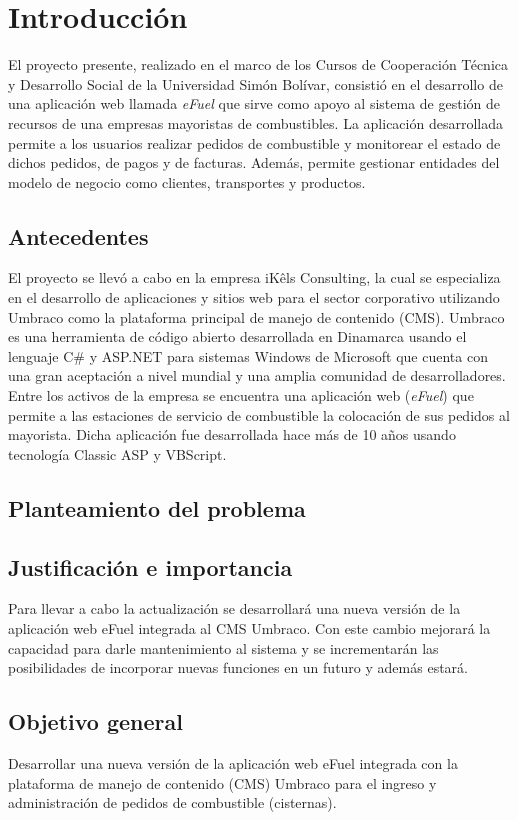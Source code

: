 \chapter*{Introducción}

El proyecto presente, realizado en el marco de los Cursos de Cooperación Técnica y Desarrollo Social de la Universidad Simón Bolívar, consistió en el desarrollo de una aplicación web llamada \emph{eFuel} que sirve como apoyo al sistema de gestión de recursos de una empresas mayoristas de combustibles. La aplicación desarrollada permite a los usuarios realizar pedidos de combustible y monitorear el estado de dichos pedidos, de pagos y de facturas. Además, permite gestionar entidades del modelo de negocio como clientes, transportes y productos.

\section*{Antecedentes}
El proyecto se llevó a cabo en la empresa iKêls Consulting, la cual se especializa en el desarrollo de aplicaciones y sitios web para el sector corporativo utilizando Umbraco como la plataforma principal de manejo de  contenido (CMS). Umbraco es una herramienta de código abierto desarrollada en Dinamarca usando el lenguaje C\# y ASP.NET para sistemas Windows de Microsoft que cuenta con una gran aceptación a nivel mundial y una amplia comunidad de desarrolladores. Entre los activos de la empresa se encuentra una aplicación web (\emph{eFuel}) que permite a las estaciones de servicio de combustible la colocación de sus pedidos al mayorista. Dicha aplicación fue desarrollada hace más de 10 años usando tecnología Classic ASP y VBScript.

\section*{Planteamiento del problema}


\section*{Justificación e importancia}
Para llevar a cabo la actualización se desarrollará una nueva versión de la aplicación web eFuel integrada al CMS Umbraco. Con este cambio mejorará la capacidad para darle mantenimiento al sistema y se incrementarán las posibilidades de incorporar nuevas funciones en un futuro y además estará.

\section*{Objetivo general}
Desarrollar una nueva versión de la aplicación web eFuel integrada con la plataforma de manejo de contenido (CMS) Umbraco para el ingreso y administración de pedidos de combustible (cisternas).

